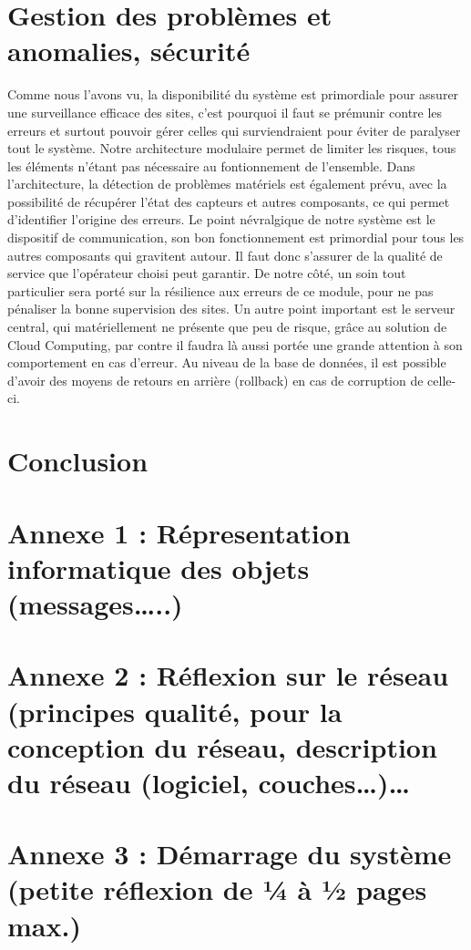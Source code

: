 \section{Gestion des problèmes et anomalies, sécurité}

Comme nous l'avons vu, la disponibilité du système est primordiale pour assurer une surveillance efficace des sites, c'est pourquoi il faut se prémunir contre les erreurs et surtout pouvoir gérer celles qui surviendraient pour éviter de paralyser tout le système. Notre architecture modulaire permet de limiter les risques, tous les éléments n'étant pas nécessaire au fontionnement de l'ensemble.
Dans l'architecture, la détection de problèmes matériels est également prévu, avec la possibilité de récupérer l'état des capteurs et autres composants, ce qui permet d'identifier l'origine des erreurs.
Le point névralgique de notre système est le dispositif de communication, son bon fonctionnement est primordial pour tous les autres composants qui gravitent autour. Il faut donc s'assurer de la qualité de service que l'opérateur choisi peut garantir. De notre côté, un soin tout particulier sera porté sur la résilience aux erreurs de ce module, pour ne pas pénaliser la bonne supervision des sites.
Un autre point important est le serveur central, qui matériellement ne présente que peu de risque, grâce au solution de Cloud Computing, par contre il faudra là aussi portée une grande attention à son comportement en cas d'erreur. Au niveau de la base de données, il est possible d'avoir des moyens de retours en arrière (rollback) en cas de corruption de celle-ci.

\section{Conclusion}

\section{Annexe 1 : Répresentation informatique des objets (messages…..)}

\section{Annexe 2 : Réflexion sur le réseau (principes qualité, pour la conception du réseau,
description du réseau (logiciel, couches…)…}

\section{Annexe 3 : Démarrage du système (petite réflexion de ¼ à ½ pages max.)}
